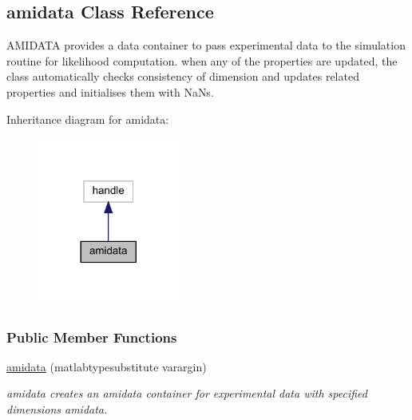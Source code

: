 \hypertarget{classamidata}{}\subsection{amidata Class Reference}
\label{classamidata}


A\+M\+I\+D\+A\+TA provides a data container to pass experimental data to the simulation routine for likelihood computation. when any of the properties are updated, the class automatically checks consistency of dimension and updates related properties and initialises them with Na\+Ns.  




Inheritance diagram for amidata\+:
\nopagebreak
\begin{figure}[H]
\begin{center}
\leavevmode
\includegraphics[width=132pt]{classamidata__inherit__graph}
\end{center}
\end{figure}
\subsubsection*{Public Member Functions}
\begin{DoxyCompactItemize}
\item 
\mbox{\hyperlink{classamidata_a28c05d6ebaf7baa45ff8b2465ce07b3f}{amidata}} (matlabtypesubstitute varargin)
\begin{DoxyCompactList}\small\item\em amidata creates an amidata container for experimental data with specified dimensions amidata. \end{DoxyCompactList}\end{DoxyCompactItemize}
